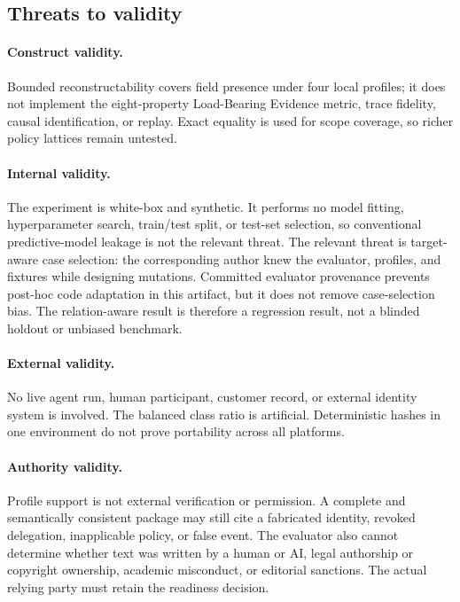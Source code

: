 \documentclass[preprint,12pt]{elsarticle}
\begin{document}
\subsection{Threats to validity}

\paragraph{Construct validity.}
Bounded reconstructability covers field presence under four local profiles; it does not implement the eight-property Load-Bearing Evidence metric, trace fidelity, causal identification, or replay. Exact equality is used for scope coverage, so richer policy lattices remain untested.

\paragraph{Internal validity.}
The experiment is white-box and synthetic. It performs no model fitting, hyperparameter search, train/test split, or test-set selection, so conventional predictive-model leakage is not the relevant threat. The relevant threat is target-aware case selection: the corresponding author knew the evaluator, profiles, and fixtures while designing mutations. Committed evaluator provenance prevents post-hoc code adaptation in this artifact, but it does not remove case-selection bias. The relation-aware result is therefore a regression result, not a blinded holdout or unbiased benchmark.

\paragraph{External validity.}
No live agent run, human participant, customer record, or external identity system is involved. The balanced class ratio is artificial. Deterministic hashes in one environment do not prove portability across all platforms.

\paragraph{Authority validity.}
Profile support is not external verification or permission. A complete and semantically consistent package may still cite a fabricated identity, revoked delegation, inapplicable policy, or false event. The evaluator also cannot determine whether text was written by a human or AI, legal authorship or copyright ownership, academic misconduct, or editorial sanctions. The actual relying party must retain the readiness decision.
\end{document}
